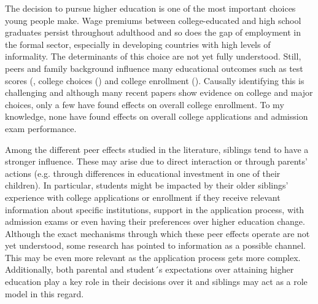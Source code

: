 



\begin{comment}

Introduce the topic area 
Must be about the economics
Never start with literature or new technique
Be specific and motivate your research question
What’s the Hook? 
    Y matters: When Y rises or falls, people are hurt or helped
    Y is puzzling: it defies easy explanation
    Y is controversial: some argue one thing while other say another
    Y is big /common / high impact / novel
    
\end{comment}

% 
The decision to pursue higher education is one of the most important choices young people make. Wage premiums between college-educated and high school graduates persist throughout adulthood and so does the gap of employment in the formal sector, especially in developing countries with high levels of informality. The determinants of this choice are not yet fully understood. Still, peers and family background influence many educational outcomes such as test scores (\cite{qureshi_siblings_2018}, college choices (\cite{altmejd_o_2021}) and college enrollment (\cite{barrios-fernandez_neighbors_2022}). Causally identifying this is challenging and although many recent papers show evidence on college and major choices, only a few have found effects on overall college enrollment. To my knowledge, none have found effects on overall college applications and admission exam performance.

Among the different peer effects studied in the literature, siblings tend to have a stronger influence. These may arise due to direct interaction or through parents' actions (e.g. through differences in educational investment in one of their children). In particular, students might be impacted by their older siblings' experience with college applications or enrollment if they receive relevant information about specific institutions, support in the application process, with admission exams or even having their preferences over higher education change. Although the exact mechanisms through which these peer effects operate are not yet understood, some research has pointed to information as a possible channel. This may be even more relevant as the application process gets more complex. Additionally, both parental and student´s expectations over attaining higher education play a key role in their decisions over it and siblings may act as a role model in this regard.

